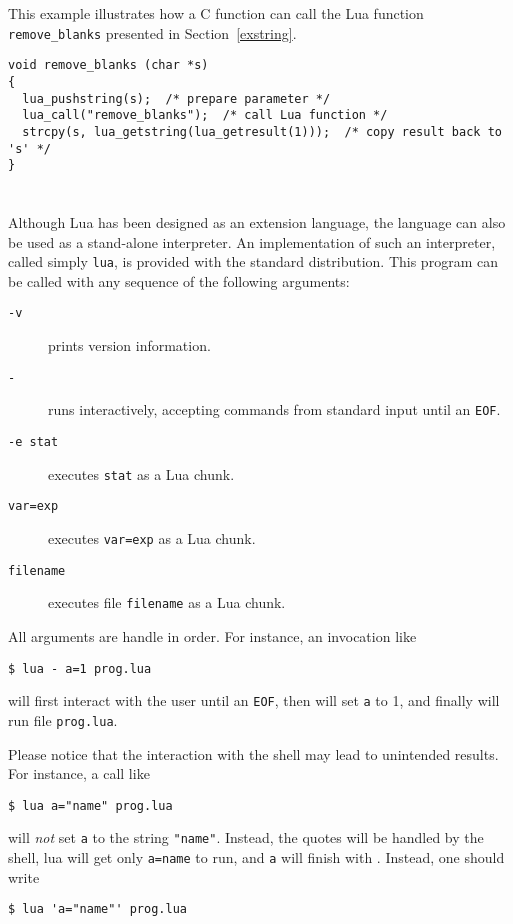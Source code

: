 This example illustrates how a C function can call the Lua function
\verb'remove_blanks' presented in Section~\ref{exstring}.
\begin{verbatim}
void remove_blanks (char *s)
{
  lua_pushstring(s);  /* prepare parameter */
  lua_call("remove_blanks");  /* call Lua function */
  strcpy(s, lua_getstring(lua_getresult(1)));  /* copy result back to 's' */
}
\end{verbatim}


\section{}

Although Lua has been designed as an extension language,
the language can also be used as a stand-alone interpreter.
An implementation of such an interpreter,
called simply \verb|lua|,
is provided with the standard distribution.
This program can be called with any sequence of the following arguments:
\begin{description}
\item[{\tt -v}] prints version information.
\item[{\tt -}] runs interactively, accepting commands from standard input
until an \verb|EOF|.
\item[{\tt -e stat}] executes \verb|stat| as a Lua chunk.
\item[{\tt var=exp}] executes \verb|var=exp| as a Lua chunk.
\item[{\tt filename}] executes file \verb|filename| as a Lua chunk.
\end{description}
All arguments are handle in order.
For instance, an invocation like
\begin{verbatim}
$ lua - a=1 prog.lua
\end{verbatim}
will first interact with the user until an \verb|EOF|,
then will set \verb'a' to 1,
and finally will run file \verb'prog.lua'.

Please notice that the interaction with the shell may lead to
unintended results.
For instance, a call like
\begin{verbatim}
$ lua a="name" prog.lua
\end{verbatim}
will {\em not} set \verb|a| to the string \verb|"name"|.
Instead, the quotes will be handled by the shell,
lua will get only \verb'a=name' to run,
and \verb'a' will finish with \nil.
Instead, one should write
\begin{verbatim}
$ lua 'a="name"' prog.lua
\end{verbatim}

